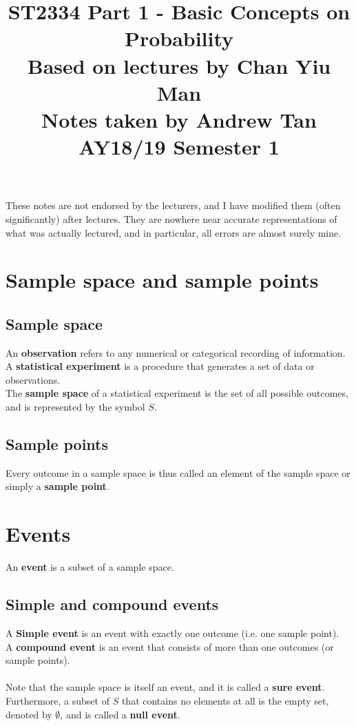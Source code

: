 \documentclass[a4paper]{article}
\title{%
	ST2334 Part 1 - Basic Concepts on Probability  \\
	\large Based on lectures by Chan Yiu Man
	\\ Notes taken by Andrew Tan
	\\ AY18/19 Semester 1
	\\ }
\author{}
\date{\vspace{-5ex}}
\begin{document}
\maketitle

\begin{center}\begin{minipage}[c]{0.9\textwidth}\centering\footnotesize These notes are not endorsed by the lecturers, and I have modified them (often significantly) after lectures. They are nowhere near accurate representations of what was actually lectured, and in particular, all errors are almost surely mine.\end{minipage}\end{center}

\section{Sample space and sample points}
\subsection{Sample space}
An \textbf{observation} refers to any numerical or categorical recording of information.\\
A \textbf{statistical experiment} is a procedure that generates a set of data or observations.\\
The \textbf{sample space} of a statistical experiment is the set of all possible outcomes, and is represented by the symbol $S$.\\
\subsection{Sample points}
Every outcome in a sample space is thus called an element of the sample space or simply a \textbf{sample point}.\\
\section{Events}
An \textbf{event} is a subset of a sample space.
\subsection{Simple and compound events}
A \textbf{Simple event} is an event with exactly one outcome (i.e. one sample point).\\
A \textbf{compound event} is an event that consists of more than one outcomes (or sample points).\\ \\
Note that the sample space is itself an event, and it is called a \textbf{sure event}. Furthermore, a subset of $S$ that contains no elements at all is the empty set, denoted by $\emptyset$, and is called a \textbf{null event}.
\end{document}

